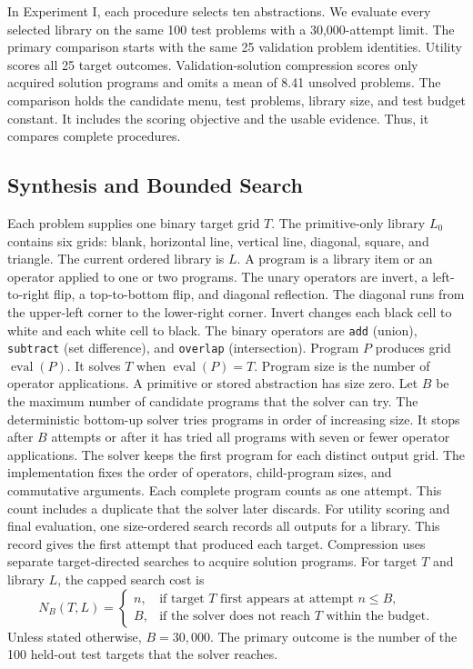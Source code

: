 \documentclass[10pt]{article}
\begin{document}
In Experiment I, each procedure selects ten abstractions. We evaluate every
selected library on the same 100 test problems with a 30,000-attempt limit.
The primary comparison starts with the same 25 validation problem identities.
Utility scores all 25 target outcomes. Validation-solution compression scores
only acquired solution programs and omits a mean of 8.41 unsolved problems.
The comparison holds the candidate menu, test problems, library size, and test
budget constant. It includes the scoring objective and the usable evidence.
Thus, it compares complete procedures.

\subsection{Synthesis and Bounded Search}

Each problem supplies one binary target grid $T$. The primitive-only library
$L_0$ contains six grids: blank, horizontal line, vertical line, diagonal,
square, and triangle. The current ordered library is $L$. A program is a
library item or an operator applied to one or two programs. The unary operators
are invert, a left-to-right flip, a top-to-bottom flip, and diagonal
reflection. The diagonal runs from the upper-left corner to the lower-right
corner. Invert changes each black cell to white and each white cell to black.
The binary operators are \texttt{add} (union), \texttt{subtract} (set
difference), and \texttt{overlap} (intersection). Program $P$ produces grid
$\operatorname{eval}(P)$. It solves $T$ when $\operatorname{eval}(P)=T$.
Program size is the number of operator applications. A primitive or stored
abstraction has size zero. Let $B$ be the maximum number of candidate programs
that the solver can try. The deterministic bottom-up solver tries programs in
order of increasing size. It stops after $B$ attempts or after it has tried all
programs with seven or fewer operator applications. The solver keeps the first
program for each distinct output grid. The implementation fixes the order of
operators, child-program sizes, and commutative arguments. Each complete program
counts as one attempt. This count includes a duplicate that the solver later
discards.
For utility scoring and final evaluation, one size-ordered search records all
outputs for a library. This record gives the first attempt that produced each
target. Compression uses separate target-directed searches to acquire solution
programs.
For target $T$ and library $L$, the capped search cost is
\begin{equation}
  N_B(T,L)=
  \begin{cases}
    n, & \text{if target $T$ first appears at attempt $n\leq B$},\\
    B, & \text{if the solver does not reach $T$ within the budget}.
  \end{cases}
\end{equation}
Unless stated otherwise, $B=30{,}000$. The primary outcome is the number of
the 100 held-out test targets that the solver reaches.
\end{document}

